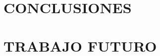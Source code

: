 \documentclass[12pt,oneside]{book}\raggedbottom{} %
\begin{document}
\begin{sloppypar}
{{\begin{itemize}
\end{itemize}

















\section*{CONCLUSIONES }
\section*{TRABAJO FUTURO}

\nocite{Hall2013}
\nocite{sakurai2017modern}
\nocite{wilde2011classical}
\nocite{2007geometry}
}

\newpage
\nocite{gomez2010introduccion}



}
\end{sloppypar}
\end{document}

